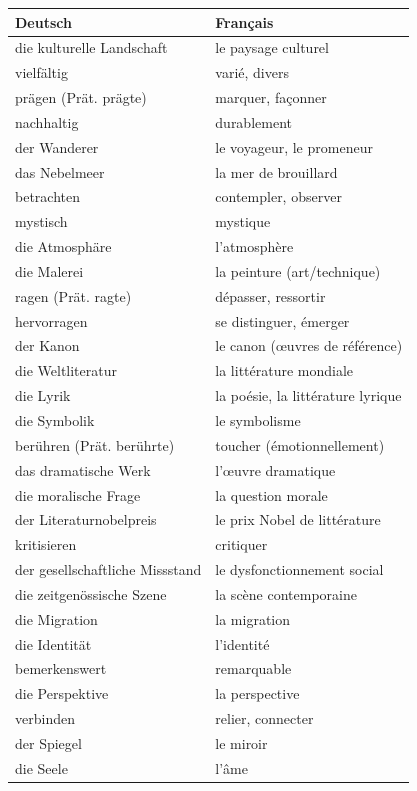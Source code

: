 \documentclass[11pt]{article}
\begin{document}
\begin{center}
\begin{tabularx}{\linewidth}{|X|X|}\hline
\rowcolor{popblueL} \textbf{Deutsch} & \textbf{Français} \\ \hline
die kulturelle Landschaft & le paysage culturel \\ \hline
vielfältig & varié, divers \\ \hline
prägen (Prät. prägte) & marquer, façonner \\ \hline
nachhaltig & durablement \\ \hline
der Wanderer & le voyageur, le promeneur \\ \hline
das Nebelmeer & la mer de brouillard \\ \hline
betrachten & contempler, observer \\ \hline
mystisch & mystique \\ \hline
die Atmosphäre & l'atmosphère \\ \hline
die Malerei & la peinture (art/technique) \\ \hline
ragen (Prät. ragte) & dépasser, ressortir \\ \hline
hervorragen & se distinguer, émerger \\ \hline
der Kanon & le canon (œuvres de référence) \\ \hline
die Weltliteratur & la littérature mondiale \\ \hline
die Lyrik & la poésie, la littérature lyrique \\ \hline
die Symbolik & le symbolisme \\ \hline
berühren (Prät. berührte) & toucher (émotionnellement) \\ \hline
das dramatische Werk & l'œuvre dramatique \\ \hline
die moralische Frage & la question morale \\ \hline
der Literaturnobelpreis & le prix Nobel de littérature \\ \hline
kritisieren & critiquer \\ \hline
der gesellschaftliche Missstand & le dysfonctionnement social \\ \hline
die zeitgenössische Szene & la scène contemporaine \\ \hline
die Migration & la migration \\ \hline
die Identität & l'identité \\ \hline
bemerkenswert & remarquable \\ \hline
die Perspektive & la perspective \\ \hline
verbinden & relier, connecter \\ \hline
der Spiegel & le miroir \\ \hline
die Seele & l'âme \\ \hline
\end{tabularx}
\end{center}
\end{document}
